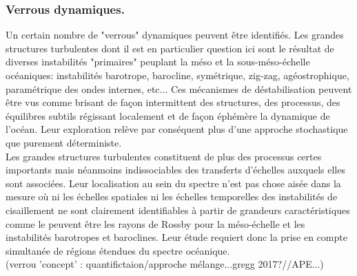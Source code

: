\subsubsection{Verrous dynamiques.}
Un certain nombre de "verrous" dynamiques peuvent être identifiés. Les grandes structures turbulentes dont il est en particulier question ici sont le résultat de diverses instabilités "primaires" peuplant la méso et la sous-méso-échelle océaniques: instabilités barotrope, barocline, symétrique, zig-zag, agéostrophique, paramétrique des ondes internes, etc... Ces mécanismes de déstabilisation peuvent être vus comme brisant de façon intermittent des structures, des processus, des équilibres subtils régissant localement et de façon éphémère la dynamique de l'océan. Leur exploration relève par conséquent plus d'une approche stochastique que purement déterministe.\\
Les grandes structures turbulentes constituent de plus des processus certes importants mais néanmoins indissociables des transferts d'échelles auxquels elles sont associées. Leur localisation au sein du spectre n'est pas chose aisée dans la mesure où ni les échelles spatiales ni les échelles temporelles des instabilités de cisaillement ne sont clairement identifiables à partir de grandeurs caractéristiques comme le peuvent être les rayons de Rossby pour la méso-échelle et les instabilités barotropes et baroclines. Leur étude requiert donc la prise en compte simultanée de régions étendues du spectre océanique.\\

\color{red}(verrou 'concept' : quantifictaion/approche mélange...gregg 2017?//APE...)\color{black}


